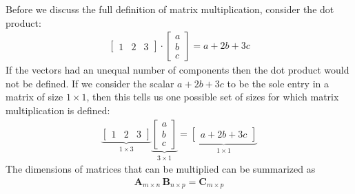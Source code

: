 \documentclass[11pt]{article}
\newcommand{\mat}[1]{\mathbf{#1}}
\begin{document}
Before we discuss the full definition of matrix multiplication, consider the dot product:
\begin{align*}
\begin{bmatrix}1 & 2 & 3\end{bmatrix} \cdot
\begin{bmatrix}a \\ b \\ c\end{bmatrix}
=
a + 2b + 3c
\end{align*}
If the vectors had an unequal number of components then the dot product would not be defined. If we consider the scalar $a + 2b + 3c$ to be the sole entry in a matrix of size $1 \times 1$, then this tells us one possible set of sizes for which matrix multiplication is defined:
\begin{align*}
\underbrace{\begin{bmatrix}1 & 2 & 3\end{bmatrix}}_{1 \times 3}
\underbrace{\begin{bmatrix}a \\ b \\ c\end{bmatrix}}_{3 \times 1}
=
\underbrace{\begin{bmatrix}a + 2b + 3c\end{bmatrix}}_{1 \times 1}
\end{align*}
The dimensions of matrices that can be multiplied can be summarized as
{\Large
\begin{align*}
\mat{A}_{m \times n} \, \mat{B}_{n \times p} = \mat{C}_{m \times p}
\end{align*}
}
\end{document}
